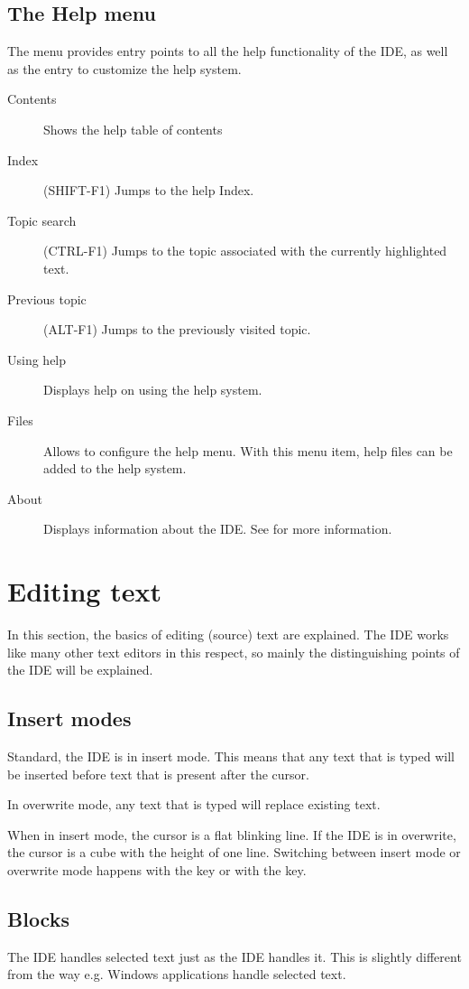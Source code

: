\subsection{The Help menu}
\label{se:menuhelp}
The  menu provides entry points to all the help functionality of
the IDE, as well as the entry to customize the help system.
\begin{description}
\item[Contents]
Shows the help table of contents
\item[Index] (SHIFT-F1)
Jumps to the help Index.
\item[Topic search]  (CTRL-F1)
Jumps to the topic associated with the currently highlighted text.
\item[Previous topic] (ALT-F1)
Jumps to the previously visited topic.
\item[Using help]
Displays help on using the help system.
\item[Files]
Allows to configure the help menu. With this menu item,  help files can be added to the help
system.
\item[About]
Displays information about the IDE. See  for more information.
\end{description}

\section{Editing text}
\label{se:editingtext}
In this section, the basics of editing (source) text are explained. The IDE
works like many other text editors in this respect, so mainly the
distinguishing points of the IDE will be explained.

\subsection{Insert modes}
Standard, the IDE is in insert mode. This means that any text that is typed
will be inserted before text that is present after the cursor.

In overwrite mode, any text that is typed will replace existing text.

When in insert mode, the cursor is a flat blinking line. If the IDE is in
overwrite, the cursor is a cube with the height of one line. Switching between
insert mode or overwrite mode happens with the  key or with the
 key.
%
%
\subsection{Blocks}
\label{se:blocks}
The IDE handles selected text just as the \tp IDE handles it. This is
slightly different from the way e.g. Windows applications handle selected
text.

